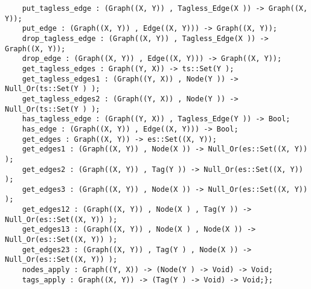\begin{verbatim}
    put_tagless_edge : (Graph((X, Y)) , Tagless_Edge(X )) -> Graph((X, Y));
    put_edge : (Graph((X, Y)) , Edge((X, Y))) -> Graph((X, Y));
    drop_tagless_edge : (Graph((X, Y)) , Tagless_Edge(X )) -> Graph((X, Y));
    drop_edge : (Graph((X, Y)) , Edge((X, Y))) -> Graph((X, Y));
    get_tagless_edges : Graph((Y, X)) -> ts::Set(Y );
    get_tagless_edges1 : (Graph((Y, X)) , Node(Y )) -> Null_Or(ts::Set(Y ) );
    get_tagless_edges2 : (Graph((Y, X)) , Node(Y )) -> Null_Or(ts::Set(Y ) );
    has_tagless_edge : (Graph((Y, X)) , Tagless_Edge(Y )) -> Bool;
    has_edge : (Graph((X, Y)) , Edge((X, Y))) -> Bool;
    get_edges : Graph((X, Y)) -> es::Set((X, Y));
    get_edges1 : (Graph((X, Y)) , Node(X )) -> Null_Or(es::Set((X, Y)) );
    get_edges2 : (Graph((X, Y)) , Tag(Y )) -> Null_Or(es::Set((X, Y)) );
    get_edges3 : (Graph((X, Y)) , Node(X )) -> Null_Or(es::Set((X, Y)) );
    get_edges12 : (Graph((X, Y)) , Node(X ) , Tag(Y )) -> Null_Or(es::Set((X, Y)) );
    get_edges13 : (Graph((X, Y)) , Node(X ) , Node(X )) -> Null_Or(es::Set((X, Y)) );
    get_edges23 : (Graph((X, Y)) , Tag(Y ) , Node(X )) -> Null_Or(es::Set((X, Y)) );
    nodes_apply : Graph((Y, X)) -> (Node(Y ) -> Void) -> Void;
    tags_apply : Graph((X, Y)) -> (Tag(Y ) -> Void) -> Void;};
\end{verbatim}
